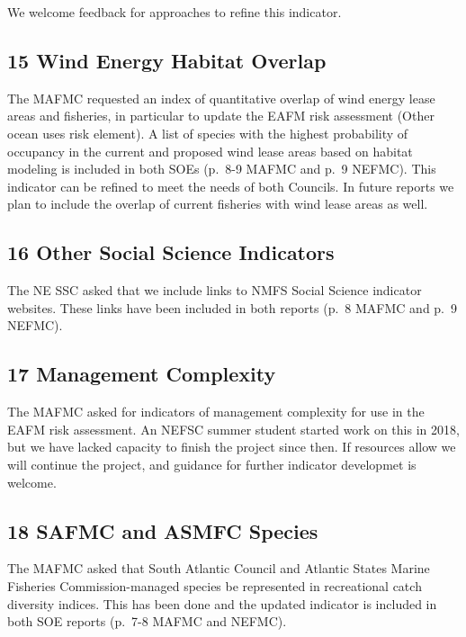 \documentclass[
  10pt,
]{article}
\begin{document}
We welcome feedback for approaches to refine this indicator.

\hypertarget{wind-energy-habitat-overlap}{%
\subsection{15 Wind Energy Habitat
Overlap}\label{wind-energy-habitat-overlap}}

The MAFMC requested an index of quantitative overlap of wind energy
lease areas and fisheries, in particular to update the EAFM risk
assessment (Other ocean uses risk element). A list of species with the
highest probability of occupancy in the current and proposed wind lease
areas based on habitat modeling is included in both SOEs (p.~8-9 MAFMC
and p.~9 NEFMC). This indicator can be refined to meet the needs of both
Councils. In future reports we plan to include the overlap of current
fisheries with wind lease areas as well.

\hypertarget{other-social-science-indicators}{%
\subsection{16 Other Social Science
Indicators}\label{other-social-science-indicators}}

The NE SSC asked that we include links to NMFS Social Science indicator
websites. These links have been included in both reports (p.~8 MAFMC and
p.~9 NEFMC).

\hypertarget{management-complexity}{%
\subsection{17 Management Complexity}\label{management-complexity}}

The MAFMC asked for indicators of management complexity for use in the
EAFM risk assessment. An NEFSC summer student started work on this in
2018, but we have lacked capacity to finish the project since then. If
resources allow we will continue the project, and guidance for further
indicator developmet is welcome.

\hypertarget{safmc-and-asmfc-species}{%
\subsection{18 SAFMC and ASMFC Species}\label{safmc-and-asmfc-species}}

The MAFMC asked that South Atlantic Council and Atlantic States Marine
Fisheries Commission-managed species be represented in recreational
catch diversity indices. This has been done and the updated indicator is
included in both SOE reports (p.~7-8 MAFMC and NEFMC).
\end{document}
